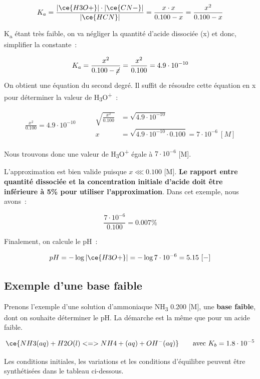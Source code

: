 \documentclass[
  11pt,
  a4paper,
  openany]{book}
\begin{document}
\[
K_a = \frac{|\ce{H3O+}| \cdot |\ce{CN-}|}{|\ce{HCN}|} = \frac{x \cdot x}{0.100 - x} = \frac{x^2}{0.100 - x}
\]

K\textsubscript{a} étant très faible, on va négliger la quantité d'acide dissociée (x) et donc, simplifier la constante~:

\[
K_a = \frac{x^2}{0.100 - \cancel{x}} = \frac{x^2}{0.100} = 4.9 \cdot 10^{-10}
\]

On obtient une équation du second degré. Il suffit de résoudre cette équation en x pour déterminer la valeur de \textbar H\textsubscript{3}O\textsuperscript{+}\textbar~:

\[
\begin{split}
\frac{x^2}{0.100} = 4.9 \cdot 10^{-10}
\end{split}
\qquad
\begin{split}
\sqrt{\frac{x^2}{0.100}} &= \sqrt{4.9 \cdot 10^{-10}} \\
x &= \sqrt{4.9 \cdot 10^{-10} \cdot 0.100} = 7 \cdot 10^{-6}\ [M]
\end{split}
\]

Nous trouvons donc une valeur de \textbar H\textsubscript{3}O\textsuperscript{+}\textbar{} égale à \(7 \cdot 10^{-6}\) {[}M{]}.

L'approximation est bien valide puisque \(x \lll 0.100\) {[}M{]}. \textbf{Le rapport entre quantité dissociée et la concentration initiale d'acide doit être inférieure à 5\% pour utiliser l'approximation}. Dans cet exemple, nous avons~:

\[
\frac{7 \cdot 10^{-6}}{0.100} = 0.007\%
\]

Finalement, on calcule le pH~:

\[
pH = - \log |\ce{H3O+}| = - \log 7 \cdot 10^{-6} = 5.15\ [-]
\]

\hypertarget{exemple-dune-base-faible}{%
\subsection{Exemple d'une base faible}\label{exemple-dune-base-faible}}

Prenons l'exemple d'une solution d'ammoniaque NH\textsubscript{3} 0.200 {[}M{]}, une \textbf{base faible}, dont on souhaite déterminer le pH. La démarche est la même que pour un acide faible.

\[
\ce{NH3(aq) + H2O(l) <=> NH4+(aq) + OH^{-}(aq)} \qquad \text{avec } K_b = 1.8 \cdot 10^{-5}
\]

Les conditions initiales, les variations et les conditions d'équilibre peuvent être synthétisées dans le tableau ci-dessous.
\end{document}

